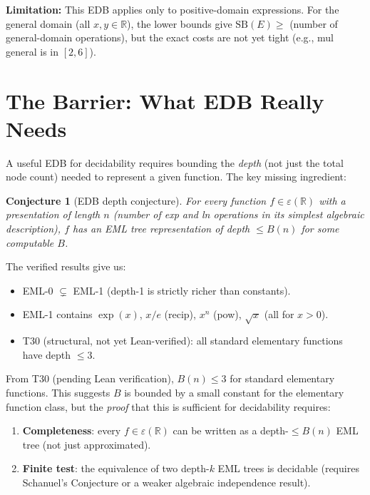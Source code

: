 \documentclass[11pt]{article}
\newtheorem{conjecture}{Conjecture}
\begin{document}
\noindent\textbf{Limitation:} This EDB applies only to positive-domain expressions.
For the general domain (all $x, y \in \mathbb{R}$), the lower bounds give
$\mathrm{SB}(E) \geq$ (number of general-domain operations), but the exact costs
are not yet tight (e.g., mul general is in $[2, 6]$).

\section{The Barrier: What EDB Really Needs}

A useful EDB for decidability requires bounding the \emph{depth} (not just the
total node count) needed to represent a given function. The key missing ingredient:

\begin{conjecture}[EDB depth conjecture]
For every function $f \in \varepsilon(\mathbb{R})$ with a presentation of length $n$
(number of exp and ln operations in its simplest algebraic description), $f$ has
an EML tree representation of depth $\leq B(n)$ for some computable $B$.
\end{conjecture}

\noindent The verified results give us:
\begin{itemize}
\item EML-0 $\subsetneq$ EML-1 (depth-1 is strictly richer than constants).
\item EML-1 contains $\exp(x)$, $x/e$ (recip), $x^n$ (pow), $\sqrt{x}$ (all for $x>0$).
\item T30 (structural, not yet Lean-verified): all standard elementary functions
  have depth $\leq 3$.
\end{itemize}

From T30 (pending Lean verification), $B(n) \leq 3$ for standard elementary functions.
This suggests $B$ is bounded by a small constant for the elementary function class,
but the \emph{proof} that this is sufficient for decidability requires:

\begin{enumerate}
\item \textbf{Completeness}: every $f \in \varepsilon(\mathbb{R})$ can be written as
  a depth-$\leq B(n)$ EML tree (not just approximated).
\item \textbf{Finite test}: the equivalence of two depth-$k$ EML trees is decidable
  (requires Schanuel's Conjecture or a weaker algebraic independence result).
\end{enumerate}
\end{document}
